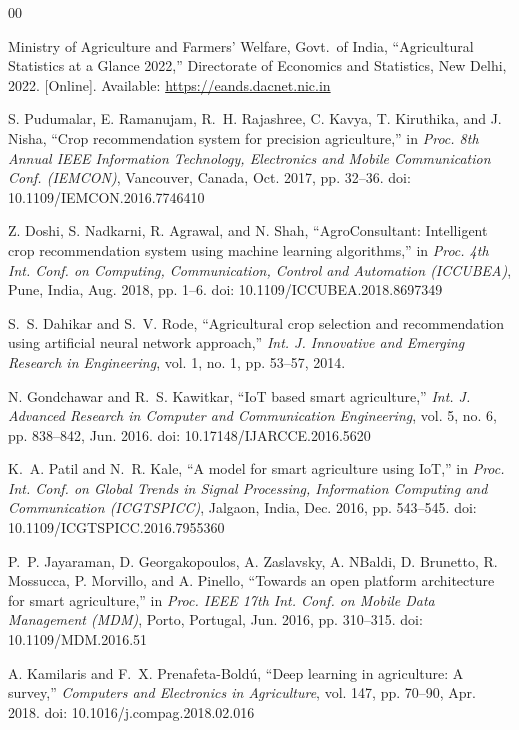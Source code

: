 \documentclass[10pt,twocolumn]{article}
\begin{document}
\begin{thebibliography}{00}

Ministry of Agriculture and Farmers' Welfare, Govt.\ of India,
``Agricultural Statistics at a Glance 2022,''
Directorate of Economics and Statistics, New Delhi, 2022.
[Online]. Available: \url{https://eands.dacnet.nic.in}

S. Pudumalar, E. Ramanujam, R.~H. Rajashree, C. Kavya, T. Kiruthika, and J. Nisha,
``Crop recommendation system for precision agriculture,''
in \textit{Proc. 8th Annual IEEE Information Technology, Electronics and Mobile Communication Conf. (IEMCON)},
Vancouver, Canada, Oct. 2017, pp. 32--36.
doi: 10.1109/IEMCON.2016.7746410

Z. Doshi, S. Nadkarni, R. Agrawal, and N. Shah,
``AgroConsultant: Intelligent crop recommendation system using machine learning algorithms,''
in \textit{Proc. 4th Int. Conf. on Computing, Communication, Control and Automation (ICCUBEA)},
Pune, India, Aug. 2018, pp. 1--6.
doi: 10.1109/ICCUBEA.2018.8697349

S.~S. Dahikar and S.~V. Rode,
``Agricultural crop selection and recommendation using artificial neural network approach,''
\textit{Int. J. Innovative and Emerging Research in Engineering},
vol. 1, no. 1, pp. 53--57, 2014.

N. Gondchawar and R.~S. Kawitkar,
``IoT based smart agriculture,''
\textit{Int. J. Advanced Research in Computer and Communication Engineering},
vol. 5, no. 6, pp. 838--842, Jun. 2016.
doi: 10.17148/IJARCCE.2016.5620

K.~A. Patil and N.~R. Kale,
``A model for smart agriculture using IoT,''
in \textit{Proc. Int. Conf. on Global Trends in Signal Processing, Information Computing and Communication (ICGTSPICC)},
Jalgaon, India, Dec. 2016, pp. 543--545.
doi: 10.1109/ICGTSPICC.2016.7955360

P.~P. Jayaraman, D. Georgakopoulos, A. Zaslavsky, A. NBaldi, D. Brunetto, R. Mossucca, P. Morvillo, and A. Pinello,
``Towards an open platform architecture for smart agriculture,''
in \textit{Proc. IEEE 17th Int. Conf. on Mobile Data Management (MDM)},
Porto, Portugal, Jun. 2016, pp. 310--315.
doi: 10.1109/MDM.2016.51

A. Kamilaris and F.~X. Prenafeta-Bold{\'u},
``Deep learning in agriculture: A survey,''
\textit{Computers and Electronics in Agriculture},
vol. 147, pp. 70--90, Apr. 2018.
doi: 10.1016/j.compag.2018.02.016


\end{thebibliography}
\end{document}
